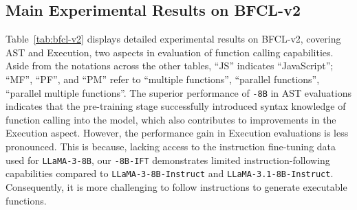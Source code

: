 



\subsection{Main Experimental Results on BFCL-v2}


Table~\ref{tab:bfcl-v2} displays detailed experimental results on BFCL-v2, covering AST and Execution, two aspects in evaluation of function calling capabilities.
Aside from the notations across the other tables, ``JS'' indicates ``JavaScript''; ``MF'', ``PF'', and ``PM'' refer to ``multiple functions'', ``parallel functions'', ``parallel multiple functions''.
The superior performance of \texttt{-8B} in AST evaluations indicates that the pre-training stage successfully introduced syntax knowledge of function calling into the model, which also contributes to improvements in the Execution aspect. However, the performance gain in Execution evaluations is less pronounced. This is because, lacking access to the instruction fine-tuning data used for \texttt{LLaMA-3-8B}, our \texttt{\method-8B-IFT} demonstrates limited instruction-following capabilities compared to \texttt{LLaMA-3-8B-Instruct} and \texttt{LLaMA-3.1-8B-Instruct}. Consequently, it is more challenging to follow instructions to generate executable functions.

